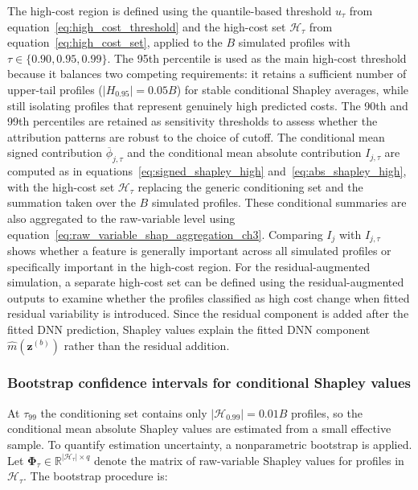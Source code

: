 The high-cost region is defined using the quantile-based threshold
$u_{\tau}$ from equation~\eqref{eq:high_cost_threshold} and the
high-cost set $\mathcal{H}_{\tau}$ from
equation~\eqref{eq:high_cost_set}, applied to the $B$ simulated profiles
with $\tau \in \{0.90, 0.95, 0.99\}$.
The 95th percentile is used as the main high-cost threshold because it
balances two competing requirements: it retains a sufficient number of
upper-tail profiles ($|H_{0.95}| = 0.05B$) for stable conditional Shapley
averages, while still isolating profiles that represent genuinely high
predicted costs. The 90th and 99th percentiles are retained as sensitivity
thresholds to assess whether the attribution patterns are robust to the
choice of cutoff. The conditional mean signed contribution
$\overline{\phi}_{j,\tau}$ and the conditional mean absolute contribution
$I_{j,\tau}$ are computed as in
equations~\eqref{eq:signed_shapley_high}
and~\eqref{eq:abs_shapley_high}, with the high-cost set
$\mathcal{H}_{\tau}$ replacing the generic conditioning set and the
summation taken over the $B$ simulated profiles. These conditional
summaries are also aggregated to the raw-variable level using
equation~\eqref{eq:raw_variable_shap_aggregation_ch3}.
Comparing $I_j$ with $I_{j,\tau}$ shows whether a feature is generally
important across all simulated profiles or specifically important in the
high-cost region. For the residual-augmented simulation, a separate high-cost
set can be defined using the residual-augmented outputs to examine whether the
profiles classified as high cost change when fitted residual variability is
introduced. Since the residual component is added after the fitted DNN
prediction, Shapley values explain the fitted DNN component
$\widehat{m}(\mathbf{z}^{(b)})$ rather than the residual addition.

\subsubsection{Bootstrap confidence intervals for conditional Shapley values}

At $\tau_{99}$ the conditioning set contains only $|\mathcal{H}_{0.99}| = 0.01B$ profiles, so the conditional mean absolute Shapley values are estimated from a small effective sample. To quantify estimation uncertainty, a nonparametric bootstrap is applied. Let $\boldsymbol{\Phi}_{\tau} \in \mathbb{R}^{|\mathcal{H}_{\tau}| \times q}$ denote the matrix of raw-variable Shapley values for profiles in $\mathcal{H}_{\tau}$. The bootstrap procedure is:

